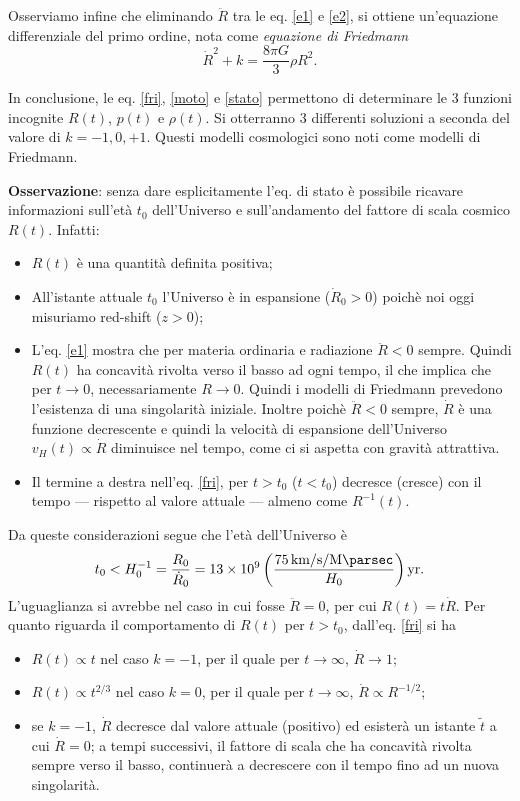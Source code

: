 Osserviamo infine che eliminando $\ddot{R}$ tra le eq.  \eqref{e1} e \eqref{e2},
si ottiene un'equazione differenziale del primo ordine, nota come
\emph{equazione di Friedmann}
\begin{equation}
  \dot{R}^2 +k = \frac{8 \pi G}{3} \rho R^2.
  \label{fri}
\end{equation}

In conclusione, le eq. \eqref{fri}, \eqref{moto} e \eqref{stato} permettono di
determinare le 3 funzioni incognite $R(t)$, $p(t)$ e $\rho(t)$.  Si otterranno 3
differenti soluzioni a seconda del valore di $k=-1,0,+1$.  Questi modelli
cosmologici sono noti come modelli di Friedmann.

\textbf{Osservazione}: senza dare esplicitamente l'eq. di stato è possibile
ricavare informazioni sull'età $t_0$ dell'Universo e sull'andamento del fattore
di scala cosmico $R(t)$.  Infatti:
\begin{itemize}
\item $R(t)$ è una quantità definita positiva;
\item All'istante attuale $t_0$ l'Universo è in espansione ($\dot{R}_0 >0$)
  poichè noi oggi misuriamo red-shift ($z>0$);
\item L'eq. \eqref{e1} mostra che per materia ordinaria e radiazione $ \ddot{R}
  < 0$ sempre.  Quindi $R(t)$ ha concavità rivolta verso il basso ad ogni tempo,
  il che implica che per $t\rightarrow 0$, necessariamente $R \rightarrow 0$.
  Quindi i modelli di Friedmann prevedono l'esistenza di una singolarità
  iniziale.  Inoltre poichè $ \ddot{R} < 0$ sempre, $\dot{R}$ è una funzione
  decrescente e quindi la velocità di espansione dell'Universo $v_H(t) \propto
  \dot{R}$ diminuisce nel tempo, come ci si aspetta con gravità attrattiva.
\item Il termine a destra nell'eq. \eqref{fri}, per $t>t_0$ ($t<t_0$) decresce
  (cresce) con il tempo --- rispetto al valore attuale --- almeno come
  $R^{-1}(t)$.
\end{itemize}

Da queste considerazioni segue che l'età dell'Universo è
\begin{equation}
  t_0 < H^{-1}_0  = \frac {R_0}{\dot{R}_0} = 13 \times 10^{9}
  \left(\frac{\SI[per-mode=reciprocal]{75}{\kilo\metre\per\second\per\mega\parsec}}{H_0}\right)
  \si{yr}.
\end{equation}
L'uguaglianza si avrebbe nel caso in cui fosse $\ddot{R} =0$, per cui $R(t)=t
\dot{R}$.  Per quanto riguarda il comportamento di $R(t)$ per $t>t_0$,
dall'eq. \eqref{fri} si ha
\begin{itemize}
\item $R(t) \propto t$ nel caso $k=-1$, per il quale per $t \to \infty$,
  $\dot{R} \to 1$;
\item $R(t) \propto t^{2/3}$ nel caso $k=0$, per il quale per $t \to \infty$,
  $\dot{R} \propto R^{-1/2}$;
\item se $k=-1$, $\dot{R}$ decresce dal valore attuale (positivo) ed esisterà un
  istante $\tilde{t}$ a cui ${\dot R}=0$; a tempi successivi, il fattore di
  scala che ha concavità rivolta sempre verso il basso, continuerà a decrescere
  con il tempo fino ad un nuova singolarità.
\end{itemize}

